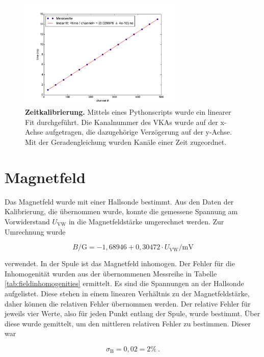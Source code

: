 \documentclass[a4paper,ngerman]{scrartcl}
\begin{document}
\begin{figure}[tb!]
\centering
\includegraphics[width=0.7\textwidth]{abbildungen/zeitkalibrierung.pdf}
\caption[Zeitkalibrierung]{\textbf{Zeitkalibrierung.} Mittels eines Pythonscripts wurde ein linearer Fit durchgeführt. Die Kanalnummer des VKAs wurde auf der x-Achse aufgetragen, die dazugehörige Verzögerung auf der y-Achse. Mit der Geradengleichung wurden Kanäle einer Zeit zugeordnet.}
\label{fig:zeitkalibrierung}
\end{figure}





\section{Magnetfeld}

Das Magnetfeld wurde mit einer Hallsonde bestimmt. Aus den Daten der Kalibrierung, die übernommen wurde, konnte die gemessene Spannung am Vorwiderstand $U_{\mathrm{VW}}$ in die Magnetfeldstärke umgerechnet werden. Zur Umrechnung wurde 

\begin{equation}
\label{eqn:B-gauss}
B \mathrm{/G} = -1,68946 + 0,30472 \cdot U_{\mathrm{VW}} \mathrm{/mV}
\end{equation}

verwendet. In der Spule ist das Magnetfeld inhomogen. Der Fehler für die Inhomogenität wurden aus der übernommenen Messreihe in Tabelle \ref{tab:fieldinhomogenities} ermittelt. Es sind die Spannungen an der Hallsonde aufgelistet. Diese stehen in einem linearen Verhältnis zu der Magnetfeldstärke, daher können die relativen Fehler übernommen werden. Der relative Fehler für jeweils vier Werte, also für jeden Punkt entlang der Spule, wurde bestimmt. Über diese wurde gemittelt, um den mittleren relativen Fehler zu bestimmen. Dieser war

\begin{equation}
\label{eqn:inhomogen_fehler}
\sigma_{\mathrm{B}} = 0,02 = 2 \% ~.
\end{equation}
\end{document}
